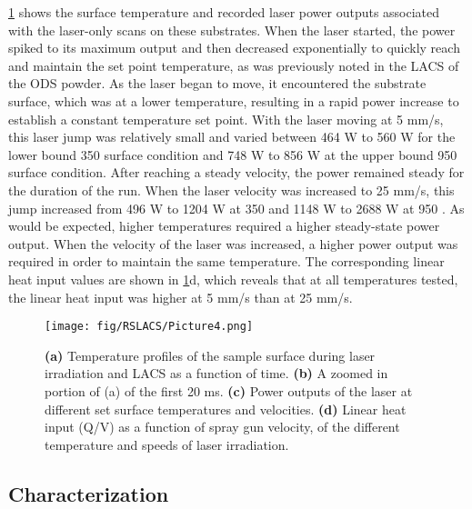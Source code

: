 		\ref{fig:RSLACS4} shows the surface temperature and recorded laser power outputs associated with the laser-only scans on these substrates. When the laser started, the power spiked to its maximum output and then decreased exponentially to quickly reach and maintain the set point temperature, as was previously noted in the LACS of the ODS powder. As the laser began to move, it encountered the substrate surface, which was at a lower temperature, resulting in a rapid power increase to establish a constant temperature set point. With the laser moving at 5 mm/s, this laser jump was relatively small and varied between 464 W to 560 W for the lower bound 350 \celsius{} surface condition and 748 W to 856 W at the upper bound 950 \celsius{} surface condition. After reaching a steady velocity, the power remained steady for the duration of the run. When the laser velocity was increased to 25 mm/s, this jump increased from 496 W to 1204 W at 350 \celsius{} and 1148 W to 2688 W at 950 \celsius{}. As would be expected, higher temperatures required a higher steady-state power output. When the velocity of the laser was increased, a higher power output was required in order to maintain the same temperature. The corresponding linear heat input values are shown in \ref{fig:RSLACS4}d, which reveals that at all temperatures tested, the linear heat input was higher at 5 mm/s than at 25 mm/s.
		
		
		\begin{figure}
			\centering
			\texttt{[image: fig/RSLACS/Picture4.png]}
			\caption[Temperature, power, and linear heat profiles of the sample surface during laser irradiation and LACS as a function of time.]{\textbf{(a)} Temperature profiles of the sample surface during laser irradiation and LACS as a function of time. \textbf{(b)} A zoomed in portion of (a) of the first 20 ms. \textbf{(c)}\textit{ }Power outputs of the laser at different set surface temperatures and velocities. \textbf{(d) }Linear heat input (Q/V) as a function of spray gun velocity, of the different temperature and speeds of laser irradiation.}
			\label{fig:RSLACS4}
		\end{figure}
		
	
		
	
	\subsection*{Characterization}
	
